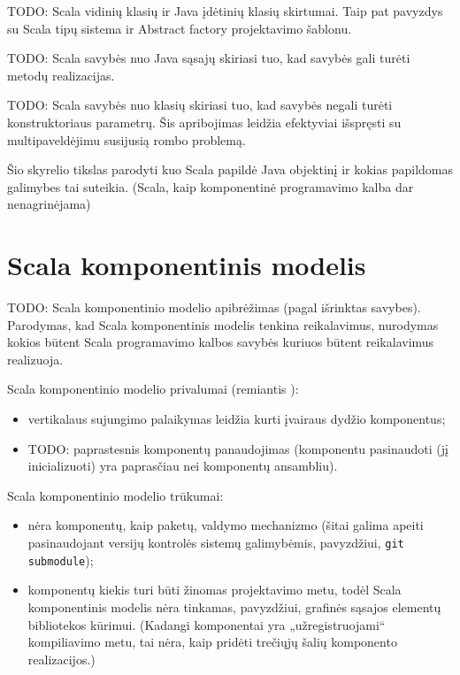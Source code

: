 TODO: Scala vidinių klasių ir Java įdėtinių klasių skirtumai. Taip pat
pavyzdys su Scala tipų sistema ir Abstract factory projektavimo šablonu.

TODO: Scala savybės nuo Java sąsajų skiriasi tuo, kad savybės gali turėti
metodų realizacijas.

TODO: Scala savybės nuo klasių skiriasi tuo, kad savybės negali turėti
konstruktoriaus parametrų. Šis apribojimas leidžia efektyviai
išspręsti su multipaveldėjimu susijusią rombo problemą.

Šio skyrelio tikslas parodyti kuo Scala papildė Java objektinį ir
kokias papildomas galimybes tai suteikia. (Scala, kaip komponentinė
programavimo kalba dar nenagrinėjama)

\section{Scala komponentinis modelis}

TODO: Scala komponentinio modelio apibrėžimas (pagal išrinktas savybes).
Parodymas, kad Scala komponentinis modelis tenkina reikalavimus,
nurodymas kokios būtent Scala programavimo kalbos savybės kuriuos
būtent reikalavimus realizuoja.

Scala komponentinio modelio privalumai (remiantis
\cite{classification-framework-for-scm}):
\begin{itemize}
  \item vertikalaus sujungimo\cite[599]{classification-framework-for-scm}
    palaikymas leidžia kurti įvairaus dydžio  komponentus;
  \item TODO: paprastesnis komponentų panaudojimas (komponentu
    pasinaudoti (jį inicializuoti) yra paprasčiau nei komponentų
    ansambliu).
\end{itemize}

Scala komponentinio modelio trūkumai:
\begin{itemize}
  \item nėra komponentų, kaip paketų, valdymo mechanizmo (šitai galima
    apeiti pasinaudojant versijų kontrolės sistemų galimybėmis,
    pavyzdžiui, \verb|git submodule|);
  \item komponentų kiekis turi būti žinomas projektavimo metu, todėl
    Scala komponentinis modelis nėra tinkamas, pavyzdžiui,
    grafinės sąsajos elementų bibliotekos 
    kūrimui. (Kadangi komponentai yra „užregistruojami“
    kompiliavimo metu, tai nėra, kaip pridėti trečiųjų šalių
    komponento realizacijos.)
\end{itemize}

